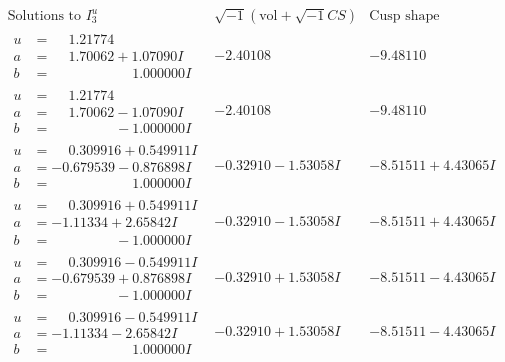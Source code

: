 \documentclass[1p]{elsarticle_modified}
\theoremstyle{definition}
\newcommand{\I}{\sqrt{-1}}
\begin{document}
$$\begin{array}{c|c|c}  
\text{Solutions to }I^u_{3}& \I (\text{vol} + \sqrt{-1}CS) & \text{Cusp shape}\\
 \hline 
\begin{aligned}
u &= \phantom{-}1.21774\phantom{ +0.000000I} \\
a &= \phantom{-}1.70062 + 1.07090 I \\
b &= \phantom{-0.000000 -}1.000000 I\end{aligned}
 & -2.40108\phantom{ +0.000000I} & -9.48110\phantom{ +0.000000I} \\ \hline\begin{aligned}
u &= \phantom{-}1.21774\phantom{ +0.000000I} \\
a &= \phantom{-}1.70062 - 1.07090 I \\
b &= \phantom{-0.000000 } -1.000000 I\end{aligned}
 & -2.40108\phantom{ +0.000000I} & -9.48110\phantom{ +0.000000I} \\ \hline\begin{aligned}
u &= \phantom{-}0.309916 + 0.549911 I \\
a &= -0.679539 - 0.876898 I \\
b &= \phantom{-0.000000 -}1.000000 I\end{aligned}
 & -0.32910 - 1.53058 I & -8.51511 + 4.43065 I \\ \hline\begin{aligned}
u &= \phantom{-}0.309916 + 0.549911 I \\
a &= -1.11334 + 2.65842 I \\
b &= \phantom{-0.000000 } -1.000000 I\end{aligned}
 & -0.32910 - 1.53058 I & -8.51511 + 4.43065 I \\ \hline\begin{aligned}
u &= \phantom{-}0.309916 - 0.549911 I \\
a &= -0.679539 + 0.876898 I \\
b &= \phantom{-0.000000 } -1.000000 I\end{aligned}
 & -0.32910 + 1.53058 I & -8.51511 - 4.43065 I \\ \hline\begin{aligned}
u &= \phantom{-}0.309916 - 0.549911 I \\
a &= -1.11334 - 2.65842 I \\
b &= \phantom{-0.000000 -}1.000000 I\end{aligned}
 & -0.32910 + 1.53058 I & -8.51511 - 4.43065 I \\ \hline\begin{aligned}

\end{aligned}
\end{array}$$
\end{document}
